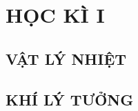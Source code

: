 \documentclass[11pt,a4paper,onecolumn,titlepage,twoside,openany]{book}
\begin{document}
	\renewcommand{\chaptername}{Chương} %
	\setcounter{page}{0}
	\FULLWIDTH
	\muclucchinh
	\clearpage%
\part{HỌC KÌ I}
\setcounter{chapter}{0}  
\chapter{VẬT LÝ NHIỆT}
%	
\setcounter{chapter}{1}
\chapter{KHÍ LÝ TƯỞNG}
%	
\newpage	
\end{document}

